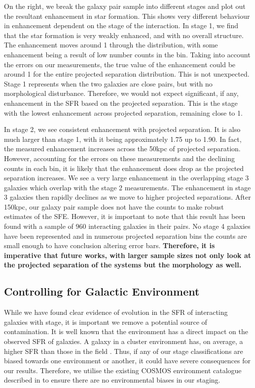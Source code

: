 On the right, we break the galaxy pair sample into different stages and plot out the resultant enhancement in star formation. This shows very different behaviour in enhancement dependent on the stage of the interaction. In stage 1, we find that the star formation is very weakly enhanced, and with no overall structure. The enhancement moves around 1 through the distribution, with some enhancement being a result of low number counts in the bin. Taking into account the errors on our measurements, the true value of the enhancement could be around 1 for the entire projected separation distribution. This is not unexpected. Stage 1 represents when the two galaxies are close pairs, but with no morphological disturbance. Therefore, we would not expect significant, if any, enhancement in the SFR based on the projected separation. This is the stage with the lowest enhancement across projected separation, remaining close to 1.

In stage 2, we see consistent enhancement with projected separation. It is also much larger than stage 1, with it being approximately 1.75 up to 1.90. In fact, the measured enhancement increases across the 50kpc of projected separation. However, accounting for the errors on these measurements and the declining counts in each bin, it is likely that the enhancement does drop as the projected separation increases. We see a very large enhancement in the overlapping stage 3 galaxies which overlap with the stage 2 measurements. The enhancement in stage 3 galaxies then rapidly declines as we move to higher projected separations. After 150kpc, our galaxy pair sample does not have the counts to make robust estimates of the SFE. However, it is important to note that this result has been found with a sample of 960 interacting galaxies in their pairs. No stage 4 galaxies have been represented and in numerous projected separation bins the counts are small enough to have conclusion altering error bars. \textbf{Therefore, it is imperative that future works, with larger sample sizes not only look at the projected separation of the systems but the morphology as well.}

\subsection{Controlling for Galactic Environment} \label{sec:env-cont}
\noindent While we have found clear evidence of evolution in the SFR of interacting galaxies with stage, it is important we remove a potential source of contamination. It is well known that the environment has a direct impact on the observed SFR of galaxies. A galaxy in a cluster environment has, on average, a higher SFR than those in the field \citep{2006MNRAS.373..469B}. Thus, if any of our stage classifications are biased towards one environment or another, it could have severe consequences for our results. Therefore, we utilise the existing COSMOS environment catalogue described in \citet{2017ApJ...837...16D} to ensure there are no environmental biases in our staging. 

